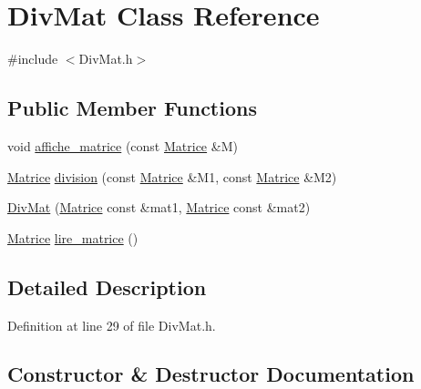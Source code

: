 \hypertarget{class_div_mat}{}\section{Div\+Mat Class Reference}
\label{class_div_mat}


{\ttfamily \#include $<$Div\+Mat.\+h$>$}

\subsection*{Public Member Functions}
\begin{DoxyCompactItemize}
\item 
void \mbox{\hyperlink{class_div_mat_af3502186db9e2cee9e0ab7997be66b31}{affiche\+\_\+matrice}} (const \mbox{\hyperlink{_div_mat_8h_a5cd1306cd22bb9a4a8d8b6ead3f49a08}{Matrice}} \&M)
\item 
\mbox{\hyperlink{_div_mat_8h_a5cd1306cd22bb9a4a8d8b6ead3f49a08}{Matrice}} \mbox{\hyperlink{class_div_mat_abb9517be4c8a45a8b958941aa8893e97}{division}} (const \mbox{\hyperlink{_div_mat_8h_a5cd1306cd22bb9a4a8d8b6ead3f49a08}{Matrice}} \&M1, const \mbox{\hyperlink{_div_mat_8h_a5cd1306cd22bb9a4a8d8b6ead3f49a08}{Matrice}} \&M2)
\item 
\mbox{\hyperlink{class_div_mat_ace4d9a85d66b5f84052c7297854975d5}{Div\+Mat}} (\mbox{\hyperlink{_div_mat_8h_a5cd1306cd22bb9a4a8d8b6ead3f49a08}{Matrice}} const \&mat1, \mbox{\hyperlink{_div_mat_8h_a5cd1306cd22bb9a4a8d8b6ead3f49a08}{Matrice}} const \&mat2)
\item 
\mbox{\hyperlink{_div_mat_8h_a5cd1306cd22bb9a4a8d8b6ead3f49a08}{Matrice}} \mbox{\hyperlink{class_div_mat_ad47640fad4498c8bcd98c1cc4f4d5c5a}{lire\+\_\+matrice}} ()
\end{DoxyCompactItemize}


\subsection{Detailed Description}


Definition at line 29 of file Div\+Mat.\+h.



\subsection{Constructor \& Destructor Documentation}
\mbox{\label{class_div_mat_ace4d9a85d66b5f84052c7297854975d5}} 
